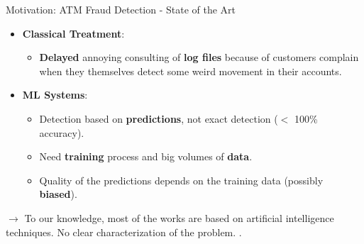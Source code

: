 \begin{frame}{Motivation: ATM Fraud Detection - State of the Art}
    \begin{itemize}
        \item {} \textbf{Classical Treatment}:
        \vspace{0.5em}
        \begin{itemize}
            \item[\textcolor{red}{\ding{55}}] \textbf{Delayed} annoying consulting of \textbf{log files} because of customers complain when they themselves detect some weird movement in their accounts.
        \end{itemize}
        \vspace{0.4em}
        \item {} \textbf{ML Systems}:
        \vspace{0.5em}
        \begin{itemize}
            \item[\textcolor{red}{\ding{55}}] Detection based on \textbf{predictions}, not exact detection ($<$ 100\% accuracy).
            \vspace{0.3em}
            \item[\textcolor{red}{\ding{55}}] Need \textbf{training} process and big volumes of \textbf{data}.
            \vspace{0.3em}
            \item[\textcolor{red}{\ding{55}}] Quality of the predictions depends on the training data (possibly \textbf{biased}).
        \end{itemize}
    \end{itemize}
    \vspace{0.5em}
    $\rightarrow$ To our knowledge, most of the works are based on artificial intelligence techniques. No clear characterization of the problem. \cite{Rahman2019}.\\
\end{frame}

